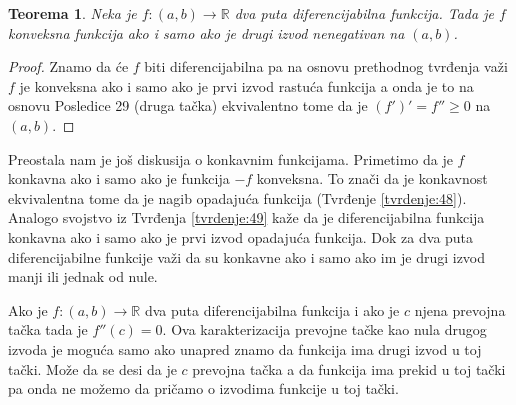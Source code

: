 \documentclass[a4paper,12pt]{article}
\theoremstyle{plain}
\newtheorem{theorem}{Teorema}[section]
\theoremstyle{definition}
\theoremstyle{remark}
\begin{document}
\begin{theorem} \label{tvrdenje:50}
Neka je $f: (a,b) \to \mathbb{R}$ dva puta diferencijabilna funkcija. Tada je $f$ konveksna funkcija ako i samo ako je drugi izvod nenegativan na $(a,b)$.
\end{theorem}

\begin{proof} Znamo da će $f$ biti diferencijabilna pa na osnovu prethodnog tvrđenja važi $f$ je konveksna ako i samo ako je prvi izvod rastuća funkcija a onda je to na osnovu Posledice 29 (druga tačka) ekvivalentno tome da je $(f')' = f'' \geq 0$ na $(a,b)$. 
\end{proof}
Preostala nam je još diskusija o konkavnim funkcijama. Primetimo da je $f$ konkavna ako i samo ako je funkcija $-f$ konveksna. To znači da je konkavnost ekvivalentna tome da je nagib opadajuća funkcija (Tvrđenje \ref{tvrdenje:48}). Analogo svojstvo iz Tvrđenja \ref{tvrdenje:49} kaže da je diferencijabilna funkcija konkavna ako i samo ako je prvi izvod opadajuća funkcija. Dok za dva puta diferencijabilne funkcije važi da su konkavne ako i samo ako im je drugi izvod manji ili jednak od nule.

Ako je $f: (a,b) \to \mathbb{R}$ dva puta diferencijabilna funkcija i ako je $c$ njena prevojna tačka tada je $f''(c) = 0$. Ova karakterizacija prevojne tačke kao nula drugog izvoda je moguća samo ako unapred znamo da funkcija ima drugi izvod u toj tački. Može da se desi da je $c$ prevojna tačka a da funkcija ima prekid u toj tački pa onda ne možemo da pričamo o izvodima funkcije u toj tački.

\newpage
\tableofcontents
\end{document}
